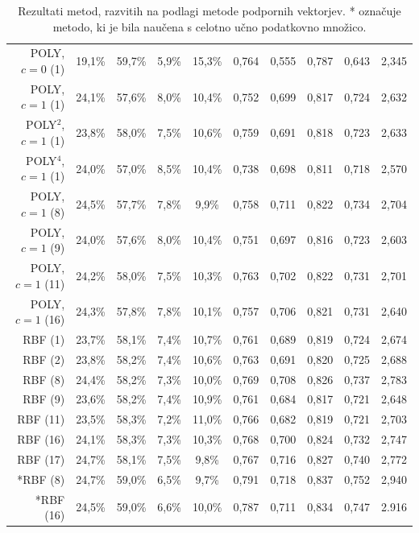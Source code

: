 \documentclass[11pt,a4paper,openany]{book}
\begin{document}
\begin{table}[h!]
\begin{tabular}{r|cccc|cccc|c}
		\hline
				
		POLY, $c=0$ (1) & 19,1\% & 59,7\% & 5,9\% & 15,3\% &
			0,764 & 0,555 & 0,787 & 0,643 &
			2,345 \\
		POLY, $c=1$ (1) & 24,1\% & 57,6\% & 8,0\% & 10,4\% &
			0,752 & 0,699 & 0,817 & 0,724 &
			2,632 \\
		POLY$^2$, $c=1$ (1) &  23,8\% & 58,0\% & 7,5\% & 10,6\% &
			0,759 & 0,691 & 0,818 & 0,723 & 
			2,633 \\		
		POLY$^4$, $c=1$ (1) & 24,0\% & 57,0\% & 8,5\% & 10,4\% &
			0,738 & 0,698 & 0,811 & 0,718 & 
			2,570 \\
		POLY, $c=1$ (8) & 24,5\% & 57,7\% & 7,8\% & 9,9\% &
			0,758 & 0,711 & 0,822 & 0,734 &
			2,704 \\
		POLY, $c=1$ (9) & 24,0\% & 57,6\% & 8,0\% & 10,4\% &
			0,751 & 0,697 & 0,816 & 0,723 &
			2,603 \\
		POLY, $c=1$ (11) & 24,2\% & 58,0\% & 7,5\% & 10,3\% &
			0,763 & 0,702 & 0,822 & 0,731 &
			2,701 \\		
		POLY, $c=1$ (16) & 24,3\% & 57,8\% & 7,8\% & 10,1\% & 
			0,757 & 0,706 & 0,821 & 0,731 &
			2,640 \\

		\hline

		RBF (1) & 23,7\% & 58,1\% & 7,4\% & 10,7\% &
			0,761 & 0,689 & 0,819 & 0,724 &
			2,674 \\								
		RBF (2) & 23,8\% & 58,2\% & 7,4\% & 10,6\% &
			0,763 & 0,691 & 0,820 & 0,725 &
			2,688 \\
		RBF (8) & 24,4\% & 58,2\% & 7,3\% & 10,0\% &
			0,769 & 0,708 & 0,826 & 0,737 &
			2,783 \\			
		RBF (9) & 23,6\% & 58,2\% & 7,4\% & 10,9\% &
			0,761 & 0,684 & 0,817 & 0,721 &
			2,648 \\
		RBF (11) & 23,5\% & 58,3\% & 7,2\% & 11,0\% &
			0,766 & 0,682 & 0,819 & 0,721 &
			2,703 \\
		RBF (16) & 24,1\% & 58,3\% & 7,3\% & 10,3\% &
			0,768 & 0,700 & 0,824 & 0,732 &
			2,747 \\
		RBF (17) & 24,7\% & 58,1\% & 7,5\% & 9,8\% &
			0,767 & 0,716 & 0,827 & 0,740 &
			2,772 \\
			
		\hline
		*RBF (8) & 24,7\% & 59,0\% & 6,5\% & 9,7\% &
			0,791 & 0,718 & 0,837 & 0,752 &
			2,940 \\
		*RBF (16) & 24,5\% & 59,0\% & 6,6\% & 10,0\% &
			0,787 & 0,711 & 0,834 & 0,747 &
			2.916 \\

		
	\end{tabular}
	\caption{Rezultati metod, razvitih na podlagi metode podpornih vektorjev. * označuje metodo, ki je bila naučena s celotno učno podatkovno množico.}
	\label{tb:svm}
\end{table}
\end{document}
